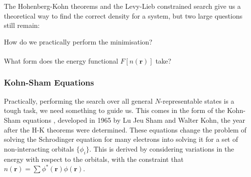 \documentclass[12pt]{article}
\begin{document}
The Hohenberg-Kohn theorems and the Levy-Lieb constrained search give us a theoretical way to find the correct density for a system, but two large questions still remain: 
\begin{displayquote}
How do we practically perform the minimisation?
\\\\
What form does the energy functional $F[n(\mathbf r)]$ take?
\end{displayquote}
\subsubsection{Kohn-Sham Equations}
Practically, performing the search over all general $N$-representable states is a tough task, we need something to guide us. 
This comes in the form of the Kohn-Sham equations \cite{kohn1965self}, developed in 1965 by Lu Jeu Sham and Walter Kohn, the year after the H-K theorems were determined. 
These equations change the problem of solving the Schrodinger equation for many electrons into solving it for a set of non-interacting orbitals $\{\phi_i\}$. This is derived by considering variations in the energy with respect to the orbitals, with the constraint that $n(\mathbf r) = \sum \phi^*(\mathbf r)\phi(\mathbf r)$.
\end{document}
